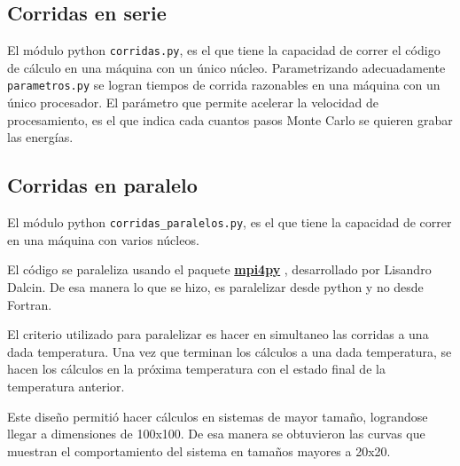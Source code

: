 \subsection{Corridas en serie}\label{serie}
El módulo python \texttt{corridas.py}, es el que tiene la capacidad de correr
el código de cálculo en una máquina con un único núcleo. Parametrizando 
adecuadamente \texttt{parametros.py} se logran tiempos de corrida razonables en 
una máquina con un único procesador. El parámetro que permite acelerar la 
velocidad de procesamiento, es el que indica cada cuantos pasos Monte Carlo se 
quieren grabar las energías.

\subsection{Corridas en paralelo}\label{paralelo}

El módulo python \texttt{corridas\_paralelos.py}, es el que tiene la capacidad 
de correr en una máquina con varios núcleos.

El código se paraleliza usando el paquete \href{http://mpi4py.scipy.org/} {\textbf{mpi4py}} ,  desarrollado por Lisandro Dalcin.
De esa manera lo que se hizo, es paralelizar desde python y no desde Fortran.

El criterio utilizado para paralelizar es hacer en simultaneo  las corridas a 
una dada temperatura. 
Una vez que terminan los cálculos a una dada temperatura, se hacen los cálculos 
en la próxima temperatura con el estado final de la temperatura anterior.

Este diseño permitió hacer cálculos en sistemas de mayor tamaño, lograndose llegar a dimensiones
de 100x100. De esa manera se obtuvieron las curvas que muestran el comportamiento del sistema en
tamaños mayores a 20x20.
